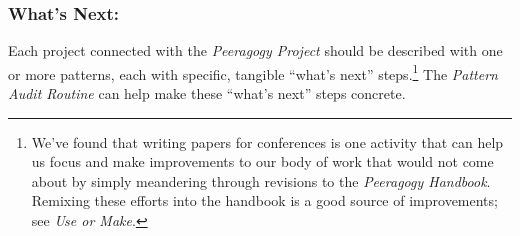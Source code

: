 \subsubsection*{What's Next:}  Each project connected with the \emph{Peeragogy Project} should be described with one or more patterns, each with specific, tangible ``what's next'' steps.\footnote{We've found that writing papers for conferences is one activity that can help us focus and make improvements to our body of work that would not come about by simply meandering through revisions to the \emph{Peeragogy Handbook}.  Remixing these efforts into the handbook is a good source of improvements; see \emph{Use or Make}.}  The \emph{Pattern Audit Routine} can help make these ``what's next'' steps concrete. 
